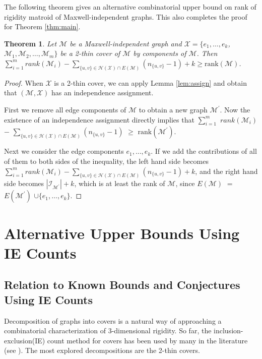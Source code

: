 \documentclass[10pt]{article}
\def\M{\mathcal {M}}
\def\I{\mathcal {I}}
\def\H{\mathcal {H}}
\def\X{\mathcal {X}}
\newtheorem{thm}{Theorem}
\begin{document}
The following theorem gives an alternative combinatorial upper bound on rank of rigidity matroid of Maxwell-independent graphs. This also completes the proof for Theorem \ref{thm:main}.

\begin{thm}\label{thm:weakrankIE}
Let $\M$ be a Maxwell-independent graph and $\X=\{e_1, \ldots, e_k$, $\M_1, \M_2, \ldots, \M_m\}$ be a 2-thin cover of $\M$ by components of $\M$. Then $\sum_{i=1}^m rank(\M_i) - \sum_{\{u, v\} \in \H(\X)\cap E(\M)}(n_{\{u, v\}}-1) +k \geq \text{rank}(\M)$.


\end{thm}
\begin{proof}

When $\X$ is a 2-thin cover, we can apply Lemma \ref{lem:assign} and obtain that $(\M, \X)$ has an independence assignment.

First we remove all edge components of $\M$ to obtain a new graph $\M^\prime$. Now the existence of an independence assignment directly implies that $\sum_{i=1}^m$ $rank(\M_i)$ $-$ $\sum_{\{u, v\} \in \H(\X)\cap E(\M)}(n_{\{u, v\}}-1)$ $\geq$ $\text{rank}(\M^\prime)$.


Next we consider the edge components $e_1, \ldots, e_k$. If we add the contributions of all of them to both sides of the inequality, the left hand side becomes $\sum_{i=1}^m rank(\M_i) - \sum_{\{u, v\} \in \H(\X)\cap E(\M)}(n_{\{u, v\}}-1) +k$, and the right hand side becomes  $ |\I_{\M^\prime}| + k$, which is at least the rank of $\M$, since $E(\M)$ $=$ $E(\M^\prime)$ $\cup\{e_1, \ldots, e_k\}$.

\end{proof}









\section{Alternative Upper Bounds Using IE Counts}\label{betterbound}
\subsection{Relation to Known Bounds and Conjectures Using IE Counts}\label{sec:knownbounds}
\noindent Decomposition of graphs into covers is a natural way of approaching a combinatorial characterization of $3$-dimensional rigidity. So far, the
inclusion-exclusion(IE) count method for covers has been used by many in the
literature (see \cite{crapo:structuralRigidity:1979, sitharam:zhou:tractableADG:2004, andrewThesis, bib:survey, lovasz:yemini, JacksonJordansparse:2005, JacksonJordanrank:2006}). The most explored decompositions are the 2-thin covers.
\end{document}
